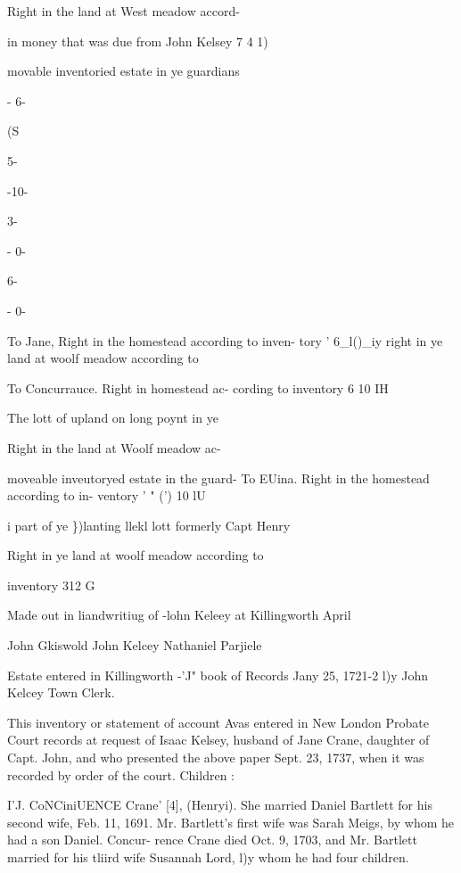 \documentclass{book}
\begin{document}
Right in the land at West meadow accord- 

in money that was due from John Kelsey 7  4  1) 


movable inventoried estate in ye guardians 






- 6- 


 (S 


5- 


-10- 




3- 


- 0- 




6- 


- 0- 





To Jane, Right in the homestead according to inven- 
tory ' 6\_l()\_iy 
right in ye land at woolf meadow according to 






To Concurrauce. Right in homestead ac- 
cording to inventory 6  10  IH 

The lott of upland on long poynt in ye 


Right in the land at Woolf meadow ac- 

moveable inveutoryed estate in the guard- 
To EUina. Right in the homestead according to in- 
ventory ' " (') 10 lU 

i part of ye \})lanting llekl lott formerly Capt Henry 


Right in ye land at woolf meadow according to 

inventory 312  G 


Made out in liandwritiug of -lohn Keleey at Killingworth April 

John Gkiswold 
John Kelcey 
Nathaniel Parjiele 

Estate entered in Killingworth -'J" book of Records Jany 25, 
1721-2 l)y John Kelcey Town Clerk. 

This inventory or statement of account Avas entered in New 
London Probate Court records at request of Isaac Kelsey, husband 
of Jane Crane, daughter of Capt. John, and who presented the 
above paper Sept. 23, 1737, when it was recorded by order of 
the court. Children : 







I'J. CoNCiniUENCE Crane' [4], (Henryi). She married Daniel 
Bartlett for his second wife, Feb. 11, 1691. Mr. Bartlett's first 
wife was Sarah Meigs, by whom he had a son Daniel. Concur- 
rence Crane died Oct. 9, 1703, and Mr. Bartlett married for his 
tliird wife Susannah Lord, l)y whom he had four children. 
\end{document}
